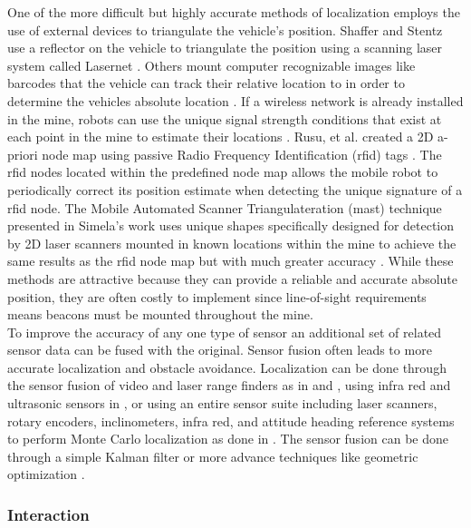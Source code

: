 One of the more difficult but highly accurate methods of localization employs the use of external devices to triangulate the vehicle's position. Shaffer and Stentz use a reflector on the vehicle to triangulate the position using a scanning laser system called Lasernet \cite{both}. Others mount computer recognizable images like barcodes that the vehicle can track their relative location to in order to determine the vehicles absolute location \cite{barcode}. If a wireless network is already installed in the mine, robots can use the unique signal strength conditions that exist at each point in the mine to estimate their locations \cite{signal}. Rusu, et al. created a 2D a-priori node map using passive Radio Frequency Identification (\acrshort{rfid}) tags \cite{rfirusu}. The \acrshort{rfid} nodes located within the predefined node map allows the mobile robot to periodically correct its position estimate when detecting the unique signature of a \acrshort{rfid} node. The Mobile Automated Scanner Triangulateration (\acrshort{mast}) technique presented in Simela's work uses unique shapes specifically designed for detection by 2D laser scanners mounted in known locations within the mine to achieve the same results as the \acrshort{rfid} node map but with much greater accuracy \cite{simela}. While these methods are attractive because they can provide a reliable and accurate absolute position, they are often costly to implement since line-of-sight requirements means beacons must be mounted throughout the mine.\\

To improve the accuracy of any one type of sensor an additional set of related sensor data can be fused with the original. Sensor fusion often leads to more accurate localization and obstacle avoidance. Localization can be done through the sensor fusion of video and laser range finders as in \cite{vis1} and \cite{vis2}, using infra red and ultrasonic sensors in \cite{irsonic}, or using an entire sensor suite including laser scanners, rotary encoders, inclinometers, infra red, and attitude heading reference systems to perform Monte Carlo localization as done in \cite{carlo}. The sensor fusion can be done through a simple Kalman filter or more advance techniques like geometric optimization \cite{geom}.\\

\subsubsection{Interaction}
\label{sec:interact}

